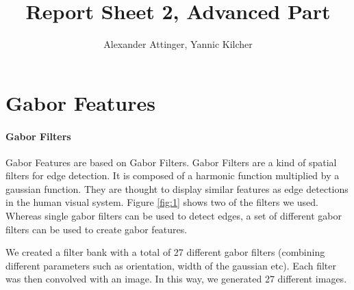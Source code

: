 \documentclass[11pt,a4paper]{article}
\author{Alexander Attinger, Yannic Kilcher}
\title{Report Sheet 2, Advanced Part}
\begin{document}
\maketitle


\section{Gabor Features}
\paragraph{Gabor Filters}
Gabor Features are based on Gabor Filters. Gabor Filters are a kind of spatial filters for edge detection. It is composed of a harmonic function multiplied by a gaussian function. They are thought to display similar features as edge detections in  the human visual system. Figure \ref{fig:1} shows two of the filters we used. Whereas single gabor filters can be used to detect edges, a set of different gabor filters can be used to create gabor features.

We created a filter bank with a total of 27 different gabor filters (combining different parameters such as orientation, width of the gaussian etc). Each filter was then convolved with an image. In this way, we generated 27 different images.
\end{document}
